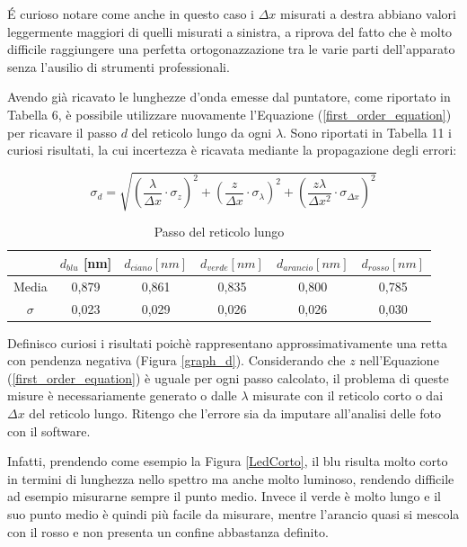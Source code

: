 \documentclass{article}
\begin{document}
É curioso notare come anche in questo caso i $\Delta x$ misurati a destra abbiano valori leggermente maggiori di quelli misurati a sinistra, a riprova del fatto che è molto difficile raggiungere una perfetta ortogonazzazione tra le varie parti dell'apparato senza l'ausilio di strumenti professionali.

\vspace{3mm}

Avendo già ricavato le lunghezze d'onda emesse dal puntatore, come riportato in Tabella 6, è possibile utilizzare nuovamente l'Equazione (\ref{first_order_equation}) per ricavare il passo $d$ del reticolo lungo da ogni $\lambda$. Sono riportati in Tabella 11 i curiosi risultati, la cui incertezza è ricavata mediante la propagazione degli errori:

\begin{equation}
    \sigma_d = \sqrt{\left(\frac{\lambda}{\Delta x}\cdot\sigma_z\right)^2 + \left(\frac{z}{\Delta x}\cdot\sigma_\lambda\right)^2 + \left(\frac{z \lambda}{\Delta x^2}\cdot\sigma_{\Delta x}\right)^2}
\end{equation}

\begin{table}[h]
    \centering
\begin{tabular}{||c|c|c|c|c|c||}
    \hline
     & \cellcolor{blue}$d_{blu}$ [nm] & \cellcolor{cyan}$d_{ciano} [nm]$ & \cellcolor{green}$d_{verde}[nm]$ & \cellcolor{orange}$d_{arancio}[nm]$ & \cellcolor{red}$d_{rosso}[nm]$ \\
    \hline
    Media & 0,879 & 0,861 & 0,835 & 0,800 & 0,785 \\
    $\sigma$ & 0,023 & 0,029 & 0,026 & 0,026 & 0,030\\
    \hline
\end{tabular}
\caption{Passo del reticolo lungo}
\end{table}

Definisco curiosi i risultati poichè rappresentano approssimativamente una retta con pendenza negativa (Figura \ref{graph_d}). Considerando che $z$ nell'Equazione (\ref{first_order_equation}) è uguale per ogni passo calcolato, il problema di queste misure è necessariamente generato o dalle $\lambda$ misurate con il reticolo corto o dai $\Delta x$ del reticolo lungo. Ritengo che l'errore sia da imputare all'analisi delle foto con il software. 

\vspace{3mm}

Infatti, prendendo come esempio la Figura \ref{LedCorto}, il blu risulta molto corto in termini di lunghezza nello spettro ma anche molto luminoso, rendendo difficile ad esempio misurarne sempre il punto medio. Invece il verde è molto lungo e il suo punto medio è quindi più facile da misurare, mentre l'arancio quasi si mescola con il rosso e non presenta un confine abbastanza definito.
\end{document}
